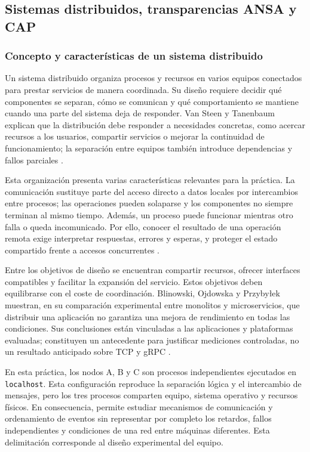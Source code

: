 \subsection{Sistemas distribuidos, transparencias ANSA y CAP}
\label{sec:fundamento-belinda}

\subsubsection{Concepto y características de un sistema distribuido}

Un sistema distribuido organiza procesos y recursos en varios equipos conectados
para prestar servicios de manera coordinada. Su diseño requiere decidir qué
componentes se separan, cómo se comunican y qué comportamiento se mantiene
cuando una parte del sistema deja de responder. Van Steen y Tanenbaum explican
que la distribución debe responder a necesidades concretas, como acercar recursos
a los usuarios, compartir servicios o mejorar la continuidad de funcionamiento;
la separación entre equipos también introduce dependencias y fallos parciales
\cite[pp.~3--8]{belinda_vansteen2023_distributed}.

Esta organización presenta varias características relevantes para la práctica.
La comunicación sustituye parte del acceso directo a datos locales por intercambios
entre procesos; las operaciones pueden solaparse y los componentes no siempre
terminan al mismo tiempo. Además, un proceso puede funcionar mientras otro falla
o queda incomunicado. Por ello, conocer el resultado de una operación remota exige
interpretar respuestas, errores y esperas, y proteger el estado compartido frente a
accesos concurrentes \cite[pp.~7--8, 13]{belinda_vansteen2023_distributed}.

Entre los objetivos de diseño se encuentran compartir recursos, ofrecer interfaces
compatibles y facilitar la expansión del servicio. Estos objetivos deben equilibrarse
con el coste de coordinación. Blinowski, Ojdowska y Przybyłek muestran, en su
comparación experimental entre monolitos y microservicios, que distribuir una
aplicación no garantiza una mejora de rendimiento en todas las condiciones. Sus
conclusiones están vinculadas a las aplicaciones y plataformas evaluadas; constituyen
un antecedente para justificar mediciones controladas, no un resultado anticipado
sobre TCP y gRPC \cite[pp.~20371--20372]{belinda_blinowski2022_architecture}.

En esta práctica, los nodos A, B y C son procesos independientes ejecutados en
\texttt{localhost}. Esta configuración reproduce la separación lógica y el intercambio
de mensajes, pero los tres procesos comparten equipo, sistema operativo y recursos
físicos. En consecuencia, permite estudiar mecanismos de comunicación y ordenamiento
de eventos sin representar por completo los retardos, fallos independientes y
condiciones de una red entre máquinas diferentes. Esta delimitación corresponde
al diseño experimental del equipo.

